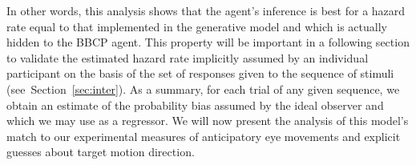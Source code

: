 \documentclass[10pt,letterpaper]{article}
\newcommand{\seeSec}[1]{Section~\ref{sec:#1}}
\begin{document}
In other words, this analysis shows that the agent's inference is best for a hazard rate
equal to that implemented in the generative model and which is actually hidden to the BBCP agent.
This property will be important in a following section
to validate the estimated hazard rate implicitly assumed by an individual participant
on the basis of the set of responses given to the  sequence of stimuli
(see~\seeSec{inter}).
%
As a summary, for each trial of any given sequence,
we obtain an estimate of the probability bias assumed by the ideal observer
and which we may use as a regressor.
We will now present the analysis of this model's match
to our experimental measures of anticipatory eye movements and
explicit guesses about target motion direction.
\end{document}
